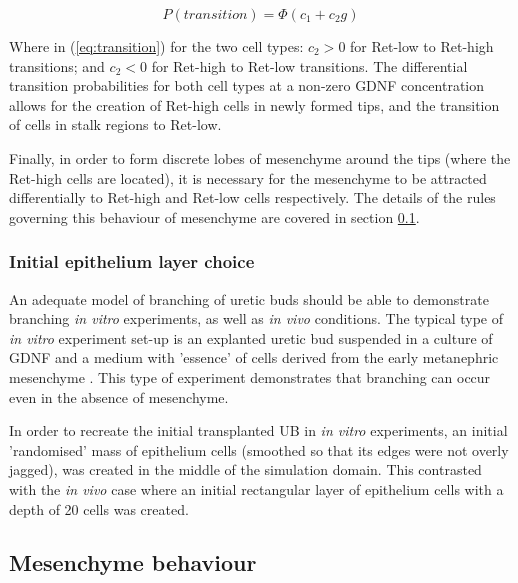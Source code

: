 \documentclass[pdftex,10pt,a4paper,twocolumn]{article}
\begin{document}
\begin{equation}\label{eq:transition}
P(transition) = \Phi (c_1 + c_2 g)
\end{equation}

Where in (\ref{eq:transition}) for the two cell types: $c_2>0$ for Ret-low to Ret-high transitions; and $c_2<0$ for Ret-high to Ret-low transitions. The differential transition probabilities for both cell types at a non-zero GDNF concentration allows for the creation of Ret-high cells in newly formed tips, and the transition of cells in stalk regions to Ret-low.

Finally, in order to form discrete lobes of mesenchyme around the tips (where the Ret-high cells are located), it is necessary for the mesenchyme to be attracted differentially to Ret-high and Ret-low cells respectively. The details of the rules governing this behaviour of mesenchyme are covered in section \ref{sec:mesenchyme}.

\subsubsection{Initial epithelium layer choice}
An adequate model of branching of uretic buds should be able to demonstrate branching \textit{in vitro} experiments, as well as \textit{in vivo} conditions. The typical type of \textit{in vitro} experiment set-up is an explanted uretic bud suspended in a culture of GDNF and a medium with 'essence' of cells derived from the early metanephric mesenchyme \cite{qiao1999branching}. This type of experiment demonstrates that branching can occur even in the absence of mesenchyme.

In order to recreate the initial transplanted UB in \textit{in vitro} experiments, an initial 'randomised' mass of epithelium cells (smoothed so that its edges were not overly jagged), was created in the middle of the simulation domain. This contrasted with the \textit{in vivo} case where an initial rectangular layer of epithelium cells with a depth of 20 cells was created.

\subsection{Mesenchyme behaviour}\label{sec:mesenchyme}
\end{document}
